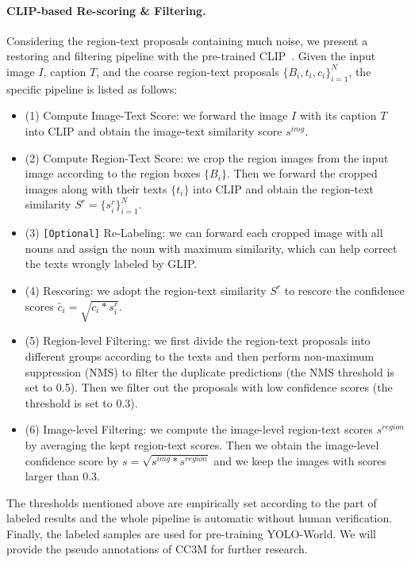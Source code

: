 \documentclass[10pt,twocolumn,letterpaper]{article}
\newcommand{\name}{YOLO-World}
\begin{document}
\paragraph{CLIP-based Re-scoring \& Filtering.}
Considering the region-text proposals containing much noise, we present a restoring and filtering pipeline with the pre-trained CLIP~\cite{CLIP}.
Given the input image $I$, caption $T$, and the coarse region-text proposals $\{B_i, t_i, c_i\}_{i=1}^N$, the specific pipeline is listed as follows:
\begin{itemize}
    \item (1) Compute Image-Text Score: we forward the image $I$ with its caption $T$ into CLIP and obtain the image-text similarity score $s^{img}$. 
    \item (2) Compute Region-Text Score: we crop the region images from the input image according to the region boxes $\{B_i\}$. Then we forward the cropped images along with their texts $\{t_i\}$ into CLIP and obtain the region-text similarity $S^{r}=\{s^r_i\}_{i=1}^N$.
    \item (3) \texttt{[Optional]} Re-Labeling: we can forward each cropped image with all nouns and assign the noun with maximum similarity, which can help correct the texts wrongly labeled by GLIP.
    \item (4) Rescoring: we adopt the region-text similarity $S^r$ to rescore the confidence scores $\tilde{c_i} = \sqrt{c_i * s^r_i}$.
    \item (5) Region-level Filtering: we first divide the region-text proposals into different groups according to the texts and then perform non-maximum suppression (NMS) to filter the duplicate predictions (the NMS threshold is set to 0.5). Then we filter out the proposals with low confidence scores (the threshold is set to 0.3).
    \item (6) Image-level Filtering: we compute the image-level region-text scores $s^{region}$ by averaging the kept region-text scores. Then we obtain the image-level confidence score by $s=\sqrt{s^{img}*s^{region}}$ and we keep the images with scores larger than 0.3.
\end{itemize}
The thresholds mentioned above are empirically set according to the part of labeled results and the whole pipeline is automatic without human verification. Finally, the labeled samples are used for pre-training \name{}. We will provide the pseudo annotations of CC3M for further research.
\end{document}

